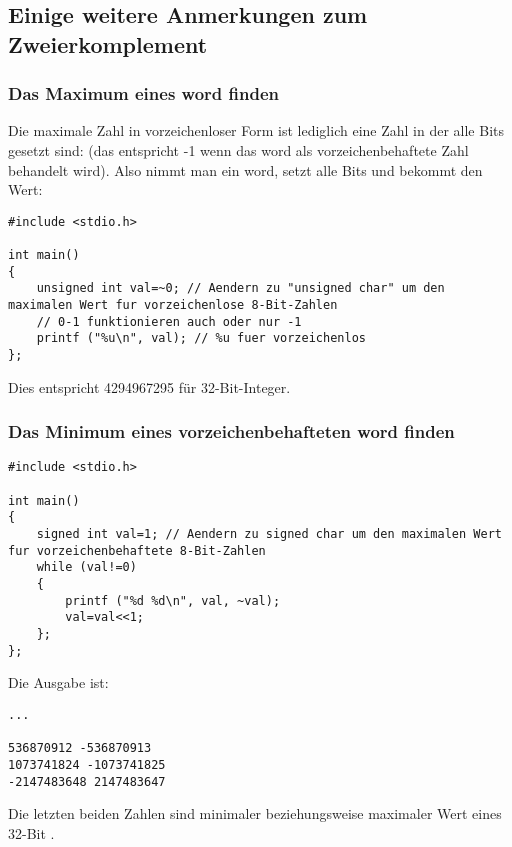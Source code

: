 \subsection{Einige weitere Anmerkungen zum Zweierkomplement}

\subsubsection{Das Maximum eines \gls{word} finden}
Die maximale Zahl in vorzeichenloser Form ist lediglich eine Zahl in der alle
Bits gesetzt sind: 
(das entspricht -1 wenn das \gls{word} als vorzeichenbehaftete Zahl behandelt wird).
Also nimmt man ein \gls{word}, setzt alle Bits und bekommt den Wert:

\begin{lstlisting}[style=customc]
#include <stdio.h>

int main()
{
	unsigned int val=~0; // Aendern zu "unsigned char" um den maximalen Wert fur vorzeichenlose 8-Bit-Zahlen
	// 0-1 funktionieren auch oder nur -1
	printf ("%u\n", val); // %u fuer vorzeichenlos
};
\end{lstlisting}

Dies entspricht 4294967295 für 32-Bit-Integer.

\subsubsection{Das Minimum eines vorzeichenbehafteten \gls{word} finden}



\begin{lstlisting}[style=customc]
#include <stdio.h>

int main()
{
	signed int val=1; // Aendern zu signed char um den maximalen Wert fur vorzeichenbehaftete 8-Bit-Zahlen
	while (val!=0)
	{
		printf ("%d %d\n", val, ~val);
		val=val<<1;
	};
};
\end{lstlisting}

Die Ausgabe ist:

\begin{lstlisting}
...

536870912 -536870913
1073741824 -1073741825
-2147483648 2147483647
\end{lstlisting}

Die letzten beiden Zahlen sind minimaler beziehungsweise maximaler Wert eines 32-Bit .
